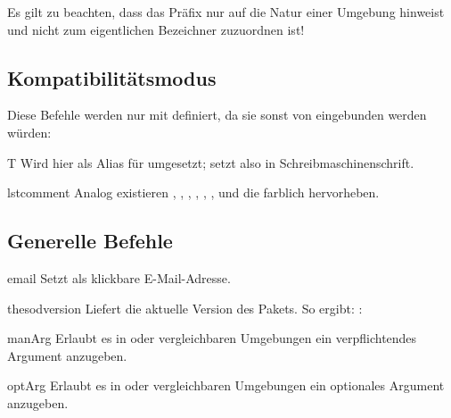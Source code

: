 \documentclass{sopra-base}
\begin{document}
Es gilt zu beachten, dass das Präfix  nur auf die Natur einer Umgebung hinweist und nicht zum eigentlichen Bezeichner zuzuordnen ist!


\subsection{Kompatibilitätsmodus}

Diese Befehle werden nur mit  definiert, da sie sonst von  eingebunden
werden würden:

\begin{command}{T}{}
    Wird hier als Alias für  umgesetzt; setzt  also in Schreibmaschinenschrift.
\end{command}


\begin{command}{lstcomment}{}
    Analog existieren , , , , , ,  und  die  farblich hervorheben.
\end{command}


\subsection{Generelle Befehle}

\begin{command}{email}{}
    Setzt  als klickbare E-Mail-Adresse.
\end{command}

\begin{command}{thesodversion}{}
    Liefert die aktuelle Version des Pakets. So ergibt: : \thesodversion\\
\end{command}

\begin{command}{manArg}{}
    Erlaubt es in  oder vergleichbaren Umgebungen ein verpflichtendes Argument anzugeben. 
\end{command}

\begin{command}{optArg}{}
    Erlaubt es in  oder vergleichbaren Umgebungen ein optionales Argument anzugeben.
\end{command}
\end{document}
